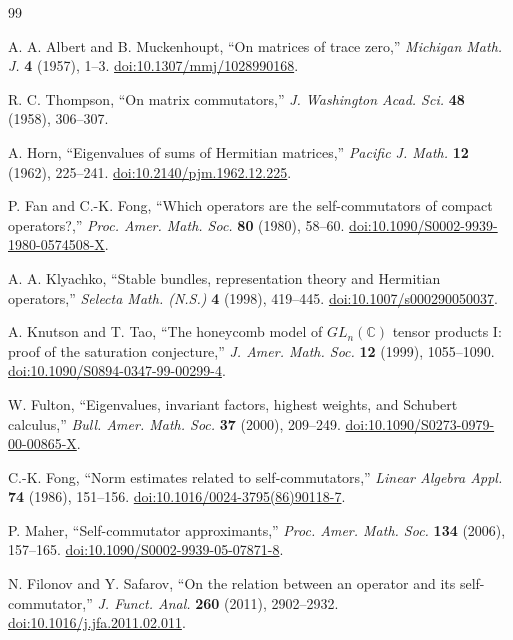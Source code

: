 \documentclass[11pt]{article}
\theoremstyle{definition}
\theoremstyle{remark}
\newcommand{\1}{\mathbf 1}
\begin{document}
\begin{thebibliography}{99}
\footnotesize

A. A. Albert and B. Muckenhoupt,
``On matrices of trace zero,''
\emph{Michigan Math. J.} \textbf{4} (1957), 1--3.
\href{https://doi.org/10.1307/mmj/1028990168}{doi:10.1307/mmj/1028990168}.

R. C. Thompson,
``On matrix commutators,''
\emph{J. Washington Acad. Sci.} \textbf{48} (1958), 306--307.

A. Horn,
``Eigenvalues of sums of Hermitian matrices,''
\emph{Pacific J. Math.} \textbf{12} (1962), 225--241.
\href{https://doi.org/10.2140/pjm.1962.12.225}{doi:10.2140/pjm.1962.12.225}.

P. Fan and C.-K. Fong,
``Which operators are the self-commutators of compact operators?,''
\emph{Proc. Amer. Math. Soc.} \textbf{80} (1980), 58--60.
\href{https://doi.org/10.1090/S0002-9939-1980-0574508-X}{doi:10.1090/S0002-9939-1980-0574508-X}.

A. A. Klyachko,
``Stable bundles, representation theory and Hermitian operators,''
\emph{Selecta Math. (N.S.)} \textbf{4} (1998), 419--445.
\href{https://doi.org/10.1007/s000290050037}{doi:10.1007/s000290050037}.

A. Knutson and T. Tao,
``The honeycomb model of $GL_n(\mathbb C)$ tensor products I: proof of the saturation conjecture,''
\emph{J. Amer. Math. Soc.} \textbf{12} (1999), 1055--1090.
\href{https://doi.org/10.1090/S0894-0347-99-00299-4}{doi:10.1090/S0894-0347-99-00299-4}.

W. Fulton,
``Eigenvalues, invariant factors, highest weights, and Schubert calculus,''
\emph{Bull. Amer. Math. Soc.} \textbf{37} (2000), 209--249.
\href{https://doi.org/10.1090/S0273-0979-00-00865-X}{doi:10.1090/S0273-0979-00-00865-X}.

C.-K. Fong,
``Norm estimates related to self-commutators,''
\emph{Linear Algebra Appl.} \textbf{74} (1986), 151--156.
\href{https://doi.org/10.1016/0024-3795(86)90118-7}{doi:10.1016/0024-3795(86)90118-7}.

P. Maher,
``Self-commutator approximants,''
\emph{Proc. Amer. Math. Soc.} \textbf{134} (2006), 157--165.
\href{https://doi.org/10.1090/S0002-9939-05-07871-8}{doi:10.1090/S0002-9939-05-07871-8}.

N. Filonov and Y. Safarov,
``On the relation between an operator and its self-commutator,''
\emph{J. Funct. Anal.} \textbf{260} (2011), 2902--2932.
\href{https://doi.org/10.1016/j.jfa.2011.02.011}{doi:10.1016/j.jfa.2011.02.011}.


\end{thebibliography}
\end{document}
